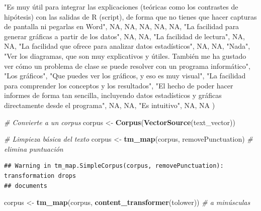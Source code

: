 \documentclass[
]{article}
\newenvironment{Shaded}{\begin{snugshade}}{\end{snugshade}}
\newcommand{\CommentTok}[1]{\textcolor[rgb]{0.56,0.35,0.01}{\textit{#1}}}
\newcommand{\ConstantTok}[1]{\textcolor[rgb]{0.56,0.35,0.01}{#1}}
\newcommand{\FunctionTok}[1]{\textcolor[rgb]{0.13,0.29,0.53}{\textbf{#1}}}
\newcommand{\NormalTok}[1]{#1}
\newcommand{\OtherTok}[1]{\textcolor[rgb]{0.56,0.35,0.01}{#1}}
\newcommand{\StringTok}[1]{\textcolor[rgb]{0.31,0.60,0.02}{#1}}
\begin{document}
\begin{Shaded}
\begin{Highlighting}[]
  \StringTok{"Es muy útil para integrar las explicaciones (teóricas como los contrastes de hipótesis) con las salidas de R (script), de forma que no tienes que hacer capturas de pantalla ni pegarlas en Word"}\NormalTok{,}
  \ConstantTok{NA}\NormalTok{,}
  \ConstantTok{NA}\NormalTok{,}
  \ConstantTok{NA}\NormalTok{,}
  \ConstantTok{NA}\NormalTok{,}
  \ConstantTok{NA}\NormalTok{,}
  \StringTok{"La facilidad para generar gráficas a partir de los datos"}\NormalTok{,}
  \ConstantTok{NA}\NormalTok{,}
  \ConstantTok{NA}\NormalTok{,}
  \StringTok{"La facilidad de lectura"}\NormalTok{,}
  \ConstantTok{NA}\NormalTok{,}
  \ConstantTok{NA}\NormalTok{,}
  \StringTok{"La facilidad que ofrece para analizar datos estadísticos"}\NormalTok{,}
  \ConstantTok{NA}\NormalTok{,}
  \ConstantTok{NA}\NormalTok{,}
  \StringTok{"Nada"}\NormalTok{,}
  \StringTok{"Ver los diagramas, que son muy explicativos y útiles. También me ha gustado ver cómo un problema de clase se puede resolver con un programa informático"}\NormalTok{,}
  \StringTok{"Los gráficos"}\NormalTok{,}
  \StringTok{"Que puedes ver los gráficos, y eso es muy visual"}\NormalTok{,}
  \StringTok{"La facilidad para comprender los conceptos y los resultados"}\NormalTok{,}
  \StringTok{"El hecho de poder hacer informes de forma tan sencilla, incluyendo datos estadísticos y gráficas directamente desde el programa"}\NormalTok{,}
  \ConstantTok{NA}\NormalTok{,}
  \ConstantTok{NA}\NormalTok{,}
  \StringTok{"Es intuitivo"}\NormalTok{,}
  \ConstantTok{NA}\NormalTok{,}
  \ConstantTok{NA}
\NormalTok{)}

\CommentTok{\# Convierte a un corpus}
\NormalTok{corpus }\OtherTok{\textless{}{-}} \FunctionTok{Corpus}\NormalTok{(}\FunctionTok{VectorSource}\NormalTok{(text\_vector))}

\CommentTok{\# Limpieza básica del texto}
\NormalTok{corpus }\OtherTok{\textless{}{-}} \FunctionTok{tm\_map}\NormalTok{(corpus, removePunctuation)                    }\CommentTok{\# elimina puntuación}
\end{Highlighting}
\end{Shaded}

\begin{verbatim}
## Warning in tm_map.SimpleCorpus(corpus, removePunctuation): transformation drops
## documents
\end{verbatim}

\begin{Shaded}
\begin{Highlighting}[]
\NormalTok{corpus }\OtherTok{\textless{}{-}} \FunctionTok{tm\_map}\NormalTok{(corpus, }\FunctionTok{content\_transformer}\NormalTok{(tolower))         }\CommentTok{\# a minúsculas}
\end{Highlighting}
\end{Shaded}
\end{document}
